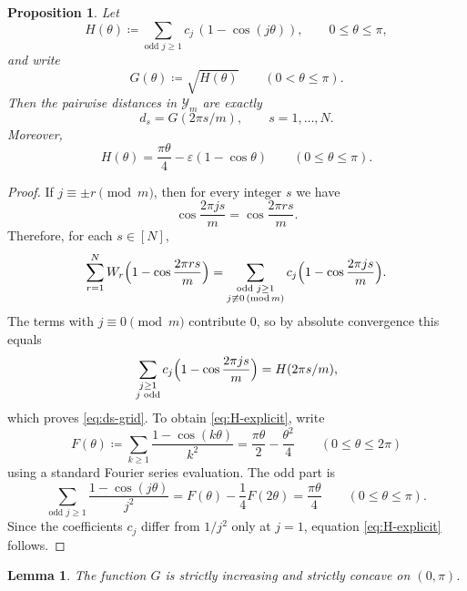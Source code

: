 \documentclass[twoside, reqno, 12pt]{amsart}
\newtheorem{proposition}[theorem]{Proposition}
\newtheorem{lemma}[theorem]{Lemma}
\theoremstyle{definition}
\theoremstyle{remark}
\begin{document}
\begin{proposition}\label{prop:discrete-profile}
Let
\begin{equation}\label{eq:H-def}
H(\theta)\coloneqq\sum_{\text{odd }j\ge 1} c_j\,(1-\cos(j\theta)),
\qquad 0\le \theta\le \pi,
\end{equation}
and write
\[
G(\theta)\coloneqq\sqrt{H(\theta)}\qquad (0<\theta\le \pi).
\]
Then the pairwise distances in $\mathcal Y_m$ are exactly
\begin{equation}\label{eq:ds-grid}
 d_s=G(2\pi s/m), \qquad s=1,\dots,N.
\end{equation}
Moreover,
\begin{equation}\label{eq:H-explicit}
H(\theta)=\frac{\pi\theta}{4}-\varepsilon(1-\cos\theta)
\qquad (0\le \theta\le \pi).
\end{equation}
\end{proposition}

\begin{proof}
If $j\equiv \pm r\pmod m$, then for every integer $s$ we have
\[
\cos\frac{2\pi js}{m}=\cos\frac{2\pi rs}{m}.
\]
Therefore, for each $s\in[N]$,
\[
\sum_{r=1}^N W_r\Bigl(1-\cos\frac{2\pi rs}{m}\Bigr)
=\sum_{\substack{\text{odd }j\ge1\\ j\not\equiv 0\, (\mathrm{mod}\,m)}} c_j\Bigl(1-\cos\frac{2\pi js}{m}\Bigr).
\]
The terms with $j\equiv 0\pmod m$ contribute $0$, so by absolute convergence
this equals
\[
\sum_{\substack{j\ge 1\\ j\text{ odd}}} c_j\Bigl(1-\cos\frac{2\pi js}{m}\Bigr)
=H(2\pi s/m),
\]
which proves \eqref{eq:ds-grid}.
To obtain \eqref{eq:H-explicit}, write
\[
F(\theta)\coloneqq\sum_{k\ge 1}\frac{1-\cos(k\theta)}{k^2}
=\frac{\pi\theta}{2}-\frac{\theta^2}{4}
\qquad (0\le \theta\le 2\pi)
\]
using a standard Fourier series evaluation. The odd part is
\[
\sum_{\text{odd }j\ge 1}\frac{1-\cos(j\theta)}{j^2}
=F(\theta)-\frac14F(2\theta)
=\frac{\pi\theta}{4}
\qquad (0\le \theta\le \pi).
\]
Since the coefficients $c_j$ differ from $1/j^2$ only at $j=1$, equation
\eqref{eq:H-explicit} follows.
\end{proof}

\begin{lemma}\label{lem:monotone-concave}
The function $G$ is strictly increasing and strictly concave on $(0,\pi)$.
\end{lemma}
\end{document}
